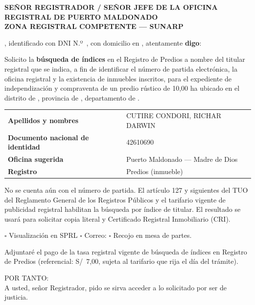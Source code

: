 \documentclass[12pt,a4paper]{article}
\begin{document}


\noindent \textbf{SEÑOR REGISTRADOR / SEÑOR JEFE DE LA OFICINA REGISTRAL DE PUERTO MALDONADO}\\
\textbf{ZONA REGISTRAL COMPETENTE --- SUNARP}

\vspace{0.35em}
\noindent \CompradorNombreCompleto, identificado con DNI N.º\ \CompradorDNI, con domicilio en \CompradorDomicilio, atentamente \textbf{digo}:

Solicito la \textbf{búsqueda de índices} en el Registro de Predios a nombre del titular registral que se indica, a fin de identificar el número de partida electrónica, la oficina registral y la existencia de inmuebles inscritos, para el expediente de independización y compraventa de un predio rústico de 10,00 ha ubicado en el distrito de \Distrito, provincia de \Provincia, departamento de \Departamento.

\renewcommand{\arraystretch}{1.28}
\noindent\begin{tabularx}{\textwidth}{>{\bfseries}p{5cm}X}
Apellidos y nombres & CUTIRE CONDORI, RICHAR DARWIN \\
Documento nacional de identidad & 42610690 \\
Oficina sugerida & Puerto Maldonado --- Madre de Dios \\
Registro & Predios (inmueble) \\
\end{tabularx}

No se cuenta aún con el número de partida. El artículo 127 y siguientes del TUO del Reglamento General de los Registros Públicos y el tarifario vigente de publicidad registral habilitan la búsqueda por índice de titular. El resultado se usará para solicitar copia literal y Certificado Registral Inmobiliario (CRI).

$\square$ Visualización en SPRL \quad $\square$ Correo: \CompradorCorreo \quad $\square$ Recojo en mesa de partes.

Adjuntaré el pago de la tasa registral vigente de búsqueda de índices en Registro de Predios (referencial: S/\ 7,00, sujeta al tarifario que rija el día del trámite).

\vspace{0.5em}
\noindent POR TANTO:\\
A usted, señor Registrador, pido se sirva acceder a lo solicitado por ser de justicia.
\end{document}
